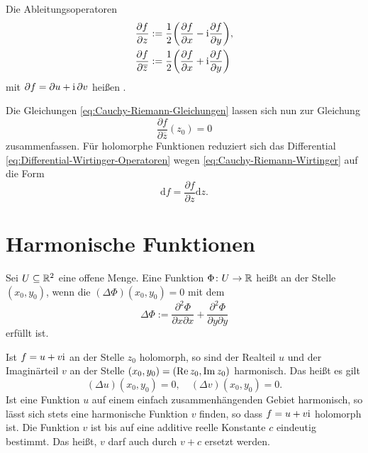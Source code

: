 Die Ableitungsoperatoren
\begin{align}
\frac{\partial f}{\partial z}
&:= \frac{1}{2}\bigg(\frac{\partial f}{\partial x}-\mathrm i\frac{\partial f}{\partial y}\bigg),\\
\frac{\partial f}{\partial\overline z}
&:= \frac{1}{2}\bigg(\frac{\partial f}{\partial x}+\mathrm i\frac{\partial f}{\partial y}\bigg)
\end{align}
mit $\partial f=\partial u+\mathrm i\,\partial v$ heißen .

Die Gleichungen \eqref{eq:Cauchy-Riemann-Gleichungen} lassen sich nun
zur Gleichung%
\begin{equation}\label{eq:Cauchy-Riemann-Wirtinger}
\frac{\partial f}{\partial\overline z}(z_0)=0
\end{equation}
zusammenfassen. Für holomorphe Funktionen reduziert sich das
Differential \eqref{eq:Differential-Wirtinger-Operatoren} wegen
\eqref{eq:Cauchy-Riemann-Wirtinger} auf die Form%
\begin{equation}
\mathrm df = \frac{\partial f}{\partial z}\mathrm dz.
\end{equation}

\newpage
\section{Harmonische Funktionen}
\begin{definition}
Sei $U\subseteq\mathbb R^2$ eine offene Menge.
Eine Funktion $\Phi\colon U\to\mathbb R$ heißt 
an der Stelle $(x_0,y_0)$, wenn die 
$(\Delta\Phi)(x_0,y_0)=0$ mit dem %
\begin{equation}
\Delta\Phi := \frac{\partial^2\Phi}{\partial x\partial x}+\frac{\partial^2\Phi}{\partial y\partial y}
\end{equation}
erfüllt ist.
\end{definition}

\noindent
Ist $f=u+v\mathrm i$ an der Stelle $z_0$ holomorph, so sind der
Realteil $u$ und der Imaginärteil $v$
an der Stelle $(x_0,y_0)=(\operatorname{Re} z_0,\operatorname{Im} z_0)$ harmonisch.
Das heißt es gilt%
\begin{equation}
(\Delta u)(x_0,y_0) = 0,\quad (\Delta v)(x_0,y_0)=0.
\end{equation}
Ist eine Funktion $u$ auf einem einfach zusammenhängenden Gebiet
harmonisch, so lässt sich stets eine harmonische Funktion $v$
finden, so dass $f=u+v\mathrm i$ holomorph ist. Die Funktion $v$ ist
bis auf eine additive reelle Konstante $c$ eindeutig bestimmt.
Das heißt, $v$ darf auch durch $v+c$ ersetzt werden.


